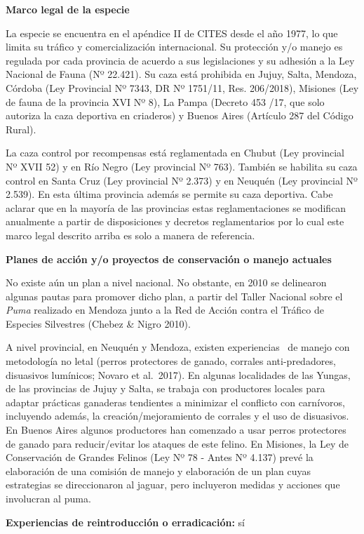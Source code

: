 \documentclass[
  x11names]{article}
\begin{document}
\textbf{Marco legal de la especie}

La especie se encuentra en el apéndice II de CITES desde el año 1977, lo
que limita su tráfico y comercialización internacional. Su protección
y/o manejo es regulada por cada provincia de acuerdo a sus legislaciones
y su adhesión a la Ley Nacional de Fauna (Nº 22.421). Su caza está
prohibida en Jujuy, Salta, Mendoza, Córdoba (Ley Provincial Nº 7343, DR
Nº 1751/11, Res. 206/2018), Misiones (Ley de fauna de la provincia XVI
Nº 8), La Pampa (Decreto 453 /17, que solo autoriza la caza deportiva en
criaderos) y Buenos Aires (Artículo 287 del Código Rural).

La caza control por recompensas está reglamentada en Chubut (Ley
provincial Nº XVII 52) y en Río Negro (Ley provincial Nº 763). También
se habilita su caza control en Santa Cruz (Ley provincial Nº 2.373) y en
Neuquén (Ley provincial Nº 2.539). En esta última provincia además se
permite su caza deportiva. Cabe aclarar que en la mayoría de las
provincias estas reglamentaciones se modifican anualmente a partir de
disposiciones y decretos reglamentarios por lo cual este marco legal
descrito arriba es solo a manera de referencia.

\textbf{Planes de acción y/o proyectos de conservación o manejo
actuales}

No existe aún un plan a nivel nacional. No obstante, en 2010 se
delinearon algunas pautas para promover dicho plan, a partir del Taller
Nacional sobre el \textit{Puma} realizado en Mendoza junto a la Red de
Acción contra el Tráfico de Especies Silvestres (Chebez \& Nigro 2010).

A nivel provincial, en Neuquén y Mendoza, existen experiencias~ de
manejo con metodología no letal (perros protectores de ganado, corrales
anti-predadores, disuasivos lumínicos; Novaro et al.~2017). En algunas
localidades de las Yungas, de las provincias de Jujuy y Salta, se
trabaja con productores locales para adaptar prácticas ganaderas
tendientes a minimizar el conflicto con carnívoros, incluyendo además,
la creación/mejoramiento de corrales y el uso de disuasivos. En Buenos
Aires algunos productores han comenzado a usar perros protectores de
ganado para reducir/evitar los ataques de este felino. En Misiones, la
Ley de Conservación de Grandes Felinos (Ley Nº 78 - Antes Nº 4.137)
prevé la elaboración de una comisión de manejo y elaboración de un plan
cuyas estrategias se direccionaron al jaguar, pero incluyeron medidas y
acciones que involucran al puma.

\textbf{Experiencias de reintroducción o erradicación:} sí
\end{document}

